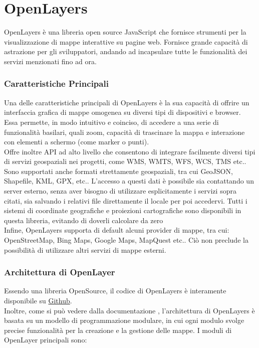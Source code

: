 \section{OpenLayers}

OpenLayers è una libreria open source JavaScript che fornisce strumenti per la visualizzazione di mappe interattive su pagine web. Fornisce grande capacità di astrazione per gli sviluppatori, andando ad incapsulare tutte le funzionalità dei servizi menzionati fino ad ora.

\subsubsection{Caratteristiche Principali}
Una delle caratteristiche principali di OpenLayers è la sua capacità di offrire un interfaccia grafica di mappe omogenea su diversi tipi di dispositivi e browser. Essa permette, in modo intuitivo e coinciso, di accedere a una serie di funzionalità basilari, quali zoom, capacità di trascinare la mappa e interazione con elementi a schermo (come marker o punti).
\\Offre inoltre API ad alto livello che consentono di integrare facilmente diversi tipi di servizi geospaziali nei progetti, come WMS, WMTS, WFS, WCS, TMS etc..
Sono supportati anche formati strettamente geospaziali, tra cui GeoJSON, Shapefile, KML, GPX, etc.. L'accesso a questi dati è possibile sia contattando un server esterno, senza aver bisogno di utilizzare esplicitamente i servizi sopra citati, sia salvando i relativi file direttamente il locale per poi accedervi.
Tutti i sistemi di coordinate geografiche e proiezioni cartografiche sono disponibili in questa libreria, evitando di doverli calcolare da zero
\\Infine, OpenLayers supporta di default alcuni provider di mappe, tra cui: OpenStreetMap, Bing Maps, Google Maps, MapQuest etc.. Ciò non preclude la possibilità di utilizzare altri servizi di mappe esterni.

\subsubsection{Architettura di OpenLayer}

Essendo una libreria OpenSource, il codice di OpenLayers è interamente disponibile su \href{https://github.com/openlayers/openlayers}{Github}.
\\Inoltre, come si può vedere dalla documentazione \cite{DocumentazioneOpenLayers}, l'architettura di OpenLayers è basata su un modello di programmazione modulare, in cui ogni modulo svolge precise funzionalità per la creazione e la gestione delle mappe. I moduli di OpenLayer principali sono:

